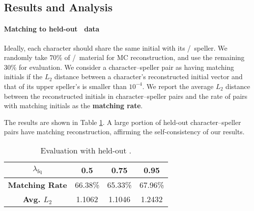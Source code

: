 \subsection{Results and Analysis} \label{sec:real-data-evaluate}
 
\paragraph{Matching to held-out \fq~data}
Ideally, each character should share the same initial with its \fq/\zhiyin~speller. 
We randomly take 70\% of \fq/\zhiyin~material for MC reconstruction, and use the remaining 30\% for evaluation. 
We consider a character--speller pair as having matching initials if the $L_2$ distance between a character's reconstructed initial vector and that of its upper speller's is smaller than $10^{-4}$. 
We report the average $L_2$ distance between the reconstructed initials in character--speller pairs and the rate of pairs with matching initials as the \textbf{matching rate}.

The results are shown in Table \ref{table:held-out}. 
A large portion of held-out character--speller pairs have matching reconstruction, affirming the self-consistency of our results. 

\begin{table}[htbp] 
  \centering
    \begin{tabular*}{\linewidth}{@{}cccc@{}}
        \toprule      {$\lambda_{\text{fq}}$} & 0.5 &0.75 &0.95 \\
        \midrule
        \textbf{Matching Rate} & 66.38\% &  65.33\%    & 67.96\% \\
        \textbf{Avg. $L_2$} &  1.1062  &  1.1046  & 1.2432 \\
        
        \bottomrule
        \end{tabular*}
    \caption{\label{table:held-out}Evaluation with held-out \fq. %
    } 
\end{table}%



\begin{comment}

\begin{figure*}[htbp]
\centering
\subfigure[FW-1]{
\label{Fig:AMI-cluster-num-1}
\texttt{[image: figure/hier2\_AMI\_num\_fq1\_cl1.jpg]}}
\subfigure[FW-3]{
\label{Fig:AMI-cluster-num-2}
\texttt{[image: figure/hier2\_AMI\_num\_fq3\_cl1.jpg]}}
\caption{The number of clusters and small clusters, and the AMI metric under different FW.}
\label{Fig:AMI-cluster-num}
\end{figure*}
    
\end{comment}